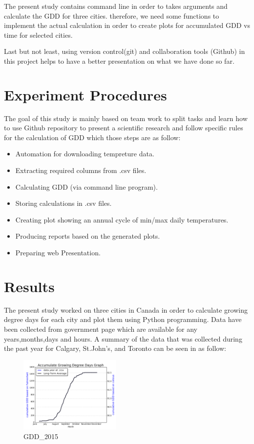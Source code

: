 \documentclass[DIV=calc, paper=a4, fontsize=11pt, twocolumn]{scrartcl}
\begin{document}
The present study contains command line in order to takes arguments and calculate the GDD for three cities. therefore, we need some functions to implement the actual calculation in order to create plots for accumulated GDD vs time for selected cities.

Last but not least, using version control(git) and collaboration tools (Github) in this project helps to have a better presentation on what we have done so far.


\section{Experiment Procedures}
The goal of this study is mainly based on team work to split tasks and learn how to use Github repository to present a scientific research and follow specific rules for the calculation of GDD which those steps are as follow:

\begin{itemize}
\item Automation for downloading tempreture data.
\item Extracting required columns from .csv files.
\item Calculating GDD (via command line program).
\item Storing calculations in .csv files.
\item Creating plot showing an annual cycle of min/max daily temperatures.
\item Producing reports based on the generated plots.
\item Preparing web Presentation.
\end{itemize}
\section{Results}
The present study worked on three cities in Canada in order to calculate growing degree days for each city and plot them using Python programming. Data have been collected from government page which are available for any years,months,days and hours. 
A summary of the data that was collected during the past year for Calgary, St.John's, and Toronto can be seen in as follow:
\begin{figure}[h!]
	\centering
	\includegraphics[width=50mm]{../output/27211_2015_gdd.png}
    \caption{GDD_2015}
	\label{fig:method7}
\end{figure}
\end{document}
